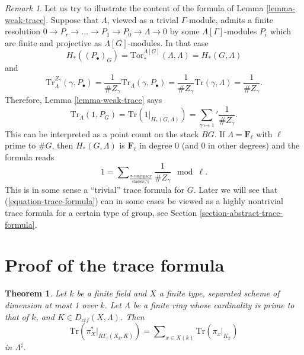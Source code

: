\documentclass{stacks-project}
\theoremstyle{plain}
\newtheorem{theorem}[subsection]{Theorem}
\theoremstyle{definition}
\theoremstyle{remark}
\newtheorem{remark}[subsection]{Remark}
\numberwithin{equation}{subsection}
\begin{document}
\begin{remark}
\label{remark-content-trivial-trace}
Let us try to illustrate the content of the formula of
Lemma \ref{lemma-weak-trace}.
Suppose that $\Lambda$, viewed as a trivial $\Gamma$-module, admits a finite
resolution
$
0\to P_r\to \ldots \to P_1 \to P_0\to \Lambda\to 0
$
by some $\Lambda[\Gamma]$-modules $P_i$ which are finite and projective as
$\Lambda[G]$-modules. In that case
$$
H_*\left(\left(P_\bullet\right)_G\right) =
\text{Tor}_*^{\Lambda[G]}\left(\Lambda, \Lambda\right) = H_*(G, \Lambda)
$$
and
$$
\text{Tr}_\Lambda^{Z_\gamma}\left(\gamma, P_\bullet\right) =\frac{1}{\#
Z_\gamma}\text{Tr}_\Lambda(\gamma, P_\bullet)=\frac{1}{\#
Z_\gamma}\text{Tr}(\gamma, \Lambda) = \frac{1}{\# Z_\gamma}.
$$
Therefore, Lemma \ref{lemma-weak-trace} says
$$
\text{Tr}_\Lambda (1 , P_G)
= \text{Tr}\left(1 |_{H_*(G, \Lambda)}\right)
= {\sum_{\gamma\mapsto 1}}'\frac{1}{\# Z_\gamma}.
$$
This can be interpreted as a point count on the stack $BG$. If
$\Lambda = \mathbf{F}_\ell$ with $\ell$ prime to $\# G$, then
$H_*(G, \Lambda)$ is $\mathbf{F}_\ell$ in degree 0 (and $0$ in
other degrees) and the formula reads
$$
1 =
\sum\nolimits_{
\frac{\sigma\text{-conjugacy}}{\text{classes}\langle\gamma\rangle}
}
\frac{1}{\# Z_\gamma} \mod \ell.
$$
This is in some sense a ``trivial'' trace formula for $G$.
Later we will see that (\ref{equation-trace-formula}) can in
some cases be viewed as a highly nontrivial trace formula for a
certain type of group, see
Section \ref{section-abstract-trace-formula}.
\end{remark}





\section{Proof of the trace formula}
\label{section-proof-trace-formula}

\begin{theorem}
\label{theorem-trace-formula-again}
Let $k$ be a finite field and $X$ a finite type, separated scheme of dimension
at most 1 over $k$. Let $\Lambda$ be a finite ring whose cardinality is prime
to that of $k$, and $K\in D_{ctf}(X, \Lambda)$. Then
\begin{equation}
\label{equation-trace-formula-again}
\text{Tr}(\pi_X^* |_{R\Gamma_c(X_{\bar k}, K)})
=
\sum\nolimits_{x\in X(k)}
\text{Tr}(\pi_x |_{K_{\bar x}})
\end{equation}
in $\Lambda^{\natural}$.
\end{theorem}
\end{document}
